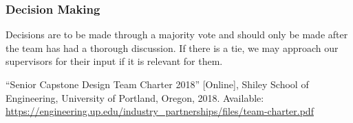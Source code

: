 \documentclass{article}
\begin{document}
\subsubsection*{Decision Making} 

Decisions are to be made through a majority vote and should only be made after the
team has had a thorough discussion. If there is a tie, we may approach our
supervisors for their input if it is relevant for them.

\newpage{}

\begin{thebibliography}{1}
   ``Senior Capstone Design Team Charter 2018'' [Online], Shiley School of Engineering, University of Portland, Oregon, 2018. Available: \url{https://engineering.up.edu/industry_partnerships/files/team-charter.pdf}
\end{thebibliography}
\end{document}
